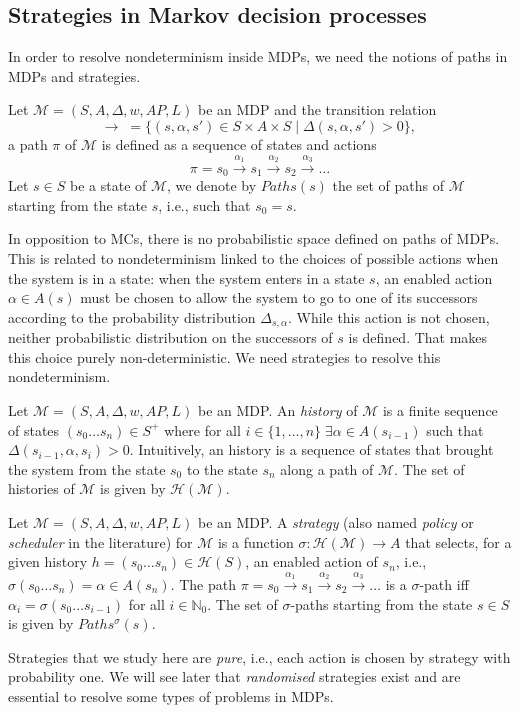 \subsection{Strategies in Markov decision processes}
In order to resolve nondeterminism inside MDPs, we need the notions of paths in MDPs and strategies.
\begin{definition}
  Let $\mathcal{M}=(S, A, \Delta, w, AP, L)$ be an MDP and the transition relation
  \[\rightarrow \; =  \{ (s, \alpha, s') \in S \times A \times S \; | \; \Delta(s, \alpha, s') > 0 \}, \,\]
	a path $\pi$ of $\mathcal{M}$ is defined as a sequence of states and actions
	\[ \pi = s_0 \xrightarrow{\alpha_1} s_1 \xrightarrow{\alpha_2} s_2 \xrightarrow{\alpha_3} \dots \]
	Let $s \in S$ be a state of $\mathcal{M}$, we denote by $Paths(s)$ the set of
	paths of $\mathcal{M}$ starting from the state $s$, i.e., such that $s_0 = s$.
\end{definition}
In opposition to MCs, there is no probabilistic space defined on paths of MDPs.
This is related to nondeterminism linked to the choices of possible actions when the system is in a state: when the system enters in a state $s$, an enabled action $\alpha \in A(s)$ must be chosen to allow the system to go to one of its successors according to the probability distribution $\Delta_{s, \alpha}$.
While this action is not chosen, neither probabilistic distribution on the successors of $s$ is defined. That makes this choice purely non-deterministic.
We need strategies to resolve this nondeterminism.
\begin{definition}
	Let $\mathcal{M} = (S, A, \Delta, w, AP, L)$ be an MDP. An \textit{history} of $\mathcal{M}$
	is a finite sequence of states $(s_0 \dots s_n) \in S^+$ where for all
	$i \in \{1, \dots, n \} \; \exists \alpha \in A(s_{i-1})$ such that $\Delta(s_{i-1}, \alpha, s_i) > 0$.
	Intuitively, an history is a sequence of states that brought the system from the state $s_0$ to the state $s_n$ along a path of $\mathcal{M}$. The set of histories of $\mathcal{M}$  is given by $\mathcal{H}(\mathcal{M})$.
\end{definition}

\begin{definition}
Let $\mathcal{M} = (S, A, \Delta, w, AP, L)$ be an MDP. A \textit{strategy} (also named \textit{policy} or \textit{scheduler} in the literature) for $\mathcal{M}$
	is a function
	$\sigma: \mathcal{H}(\mathcal{M}) \rightarrow A$
	that selects, for a given history $h = (s_0 \dots s_n) \in \mathcal{H}(S)$, an enabled action of $s_n$, i.e., $\sigma(s_0 \dots s_n) = \alpha \in A(s_n)$.
	The path $\pi = s_0 \xrightarrow{\alpha_1} s_1 \xrightarrow{\alpha_2} s_2 \xrightarrow{\alpha_3} \dots$
	is a $\sigma$-path iff $\alpha_i = \sigma(s_0 \dots s_{i-1})$
	for all $i \in \mathbb{N}_0$. The set of $\sigma$-paths starting from the state $s \in S$ is given by $Paths^\sigma(s)$.
\end{definition}
Strategies that we study here are \textit{pure}, i.e., each action is chosen by strategy with probability one. We will see later that \textit{randomised} strategies exist and are essential to resolve some types of problems in MDPs. \\

